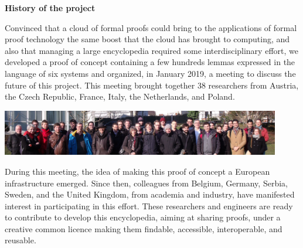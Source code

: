 \begin{framed}

\begin{center}
{\bf \Large History of the project}
\end{center}

Convinced that a cloud of formal proofs could bring to the
applications of formal proof technology the same boost that the cloud
has brought to computing, and also that managing a large encyclopedia
required some interdisciplinary effort, 
we developed a proof of concept containing a few hundreds lemmas 
expressed in the language of six systems and organized, in January 2019,
a meeting to discuss the future of this project.
This
meeting brought together 38 researchers from Austria, the Czech
Republic, France, Italy, the Netherlands, and Poland.  
\begin{center}
\includegraphics[height=2cm]{photo.png}
\end{center}
During this meeting, the idea of making this proof of concept a European 
infrastructure emerged.
Since then,
colleagues from Belgium, Germany, Serbia, Sweden, and the United
Kingdom, from academia and industry, have manifested interest in
participating in this effort.  These researchers and engineers are
ready to contribute to develop this encyclopedia, aiming at sharing
proofs, under a creative common licence making them findable,
accessible, interoperable, and reusable.

\end{framed}



